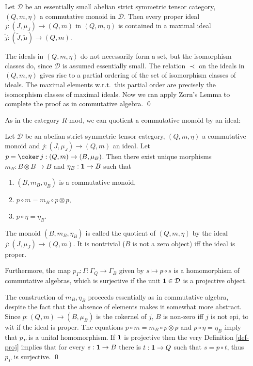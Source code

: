 \documentclass[12pt]{article}
\theoremstyle{definition}
\theoremstyle{definition}
\theoremstyle{remark}
\def\2#1{{\mathcal #1}}
\def\1#1{{\bf #1}}
\newcommand{\mcirc}{\circ}
\newcommand{\rarr}{\rightarrow}
\newcounter{bean}
\begin{document}
\blemma \label{l-maxid}
Let $\2D$ be an essentially small abelian strict symmetric tensor category, $(Q,m,\eta)$ a
commutative monoid in $\2D$. Then every proper ideal $j:(J,\mu_J)\rarr(Q,m)$ in $(Q,m,\eta)$ is
contained in a maximal ideal $\widetilde{j}:(\widetilde{J},\widetilde{\mu})\rarr(Q,m)$.
\elemma

\prf The ideals in $(Q,m,\eta)$ do not necessarily form a set, but the isomorphism classes do, since
$\2D$ is assumed essentially small. The relation $\prec$ on the ideals in $(Q,m,\eta)$ gives rise to
a partial ordering of the set of isomorphism classes of ideals. The maximal elements w.r.t.\ this
partial order are precisely the isomorphism classes of maximal ideals. Now we can apply Zorn's Lemma
to complete the proof as in commutative algebra.
\qed

As in the category $R$-mod, we can quotient a commutative monoid by an ideal:

\blemma \label{l-quot} 
Let $\2D$ be an abelian strict symmetric tensor category, $(Q,m,\eta)$ a commutative monoid and
$j:(J,\mu_J)\rarr(Q,m)$ an ideal. Let $p=\coker\,j:(Q,m)\rarr(B,\mu_B)$. Then there exist unique
morphisms $m_B: B\otimes B\rarr B$ and $\eta_B: \11\rarr B$ such that  
\begin{enumerate}
\item $(B,m_B,\eta_B)$ is a commutative monoid,
\item $p\mcirc m=m_B\mcirc p\otimes p$,
\item $p\circ\eta=\eta_B$. 
\end{enumerate}
The monoid $(B,m_B,\eta_B)$ is called the quotient of $(Q,m,\eta)$ by the ideal
$j:(J,\mu_J)\rarr(Q,m)$. It is nontrivial ($B$ is not a zero object) iff the ideal is proper.

Furthermore, the map $p_\Gamma:\Gamma:\Gamma_Q\rarr\Gamma_B$ given by $s\mapsto p\circ s$ is a
homomorphism of commutative algebras, which is surjective if the unit $\11\in\2D$ is a projective
object.
\elemma

\prf The construction of $m_B,\eta_B$ proceeds essentially as in commutative algebra, despite the
fact that the absence of elements makes it somewhat more abstract. Since $p:(Q,m)\rarr(B,\mu_B)$ is
the cokernel of $j$, $B$ is non-zero iff $j$ is not epi, to wit if the ideal is proper. The
equations $p\mcirc m=m_B\mcirc p\otimes p$ and $p\circ\eta=\eta_B$ imply that $p_\Gamma$ is a unital
homomorphism. 
If $\11$ is projective then the very Definition \ref{def-proj} implies that for every $s:\11\rarr B$
there is $t:\11\rarr Q$ such that $s=p\circ t$, thus $p_\Gamma$ is surjective.
\qed
\end{document}
